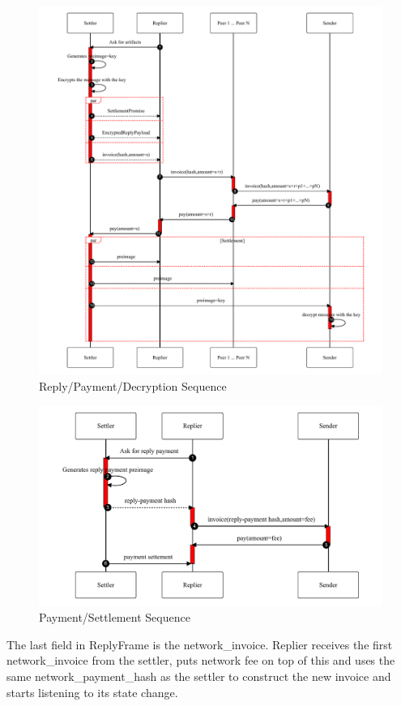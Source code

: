 \documentclass{article}
\begin{document}
\begin{figure}
	\centering
	\includegraphics[scale=0.8]{ReplyAndPay.pdf}
	\caption{Reply/Payment/Decryption Sequence}
	\label{fig:replyandpay}
\end{figure}

\begin{figure}
	\centering
	\includegraphics[scale=0.8]{PayForService.pdf}
	\caption{Payment/Settlement Sequence}
	\label{fig:payforservice}
\end{figure}

The last field in ReplyFrame is the network\_invoice. Replier receives the first network\_invoice from the settler, puts network fee on top of this and uses the same network\_payment\_hash as the settler to construct the new invoice and starts listening to its state change. 
\end{document}
